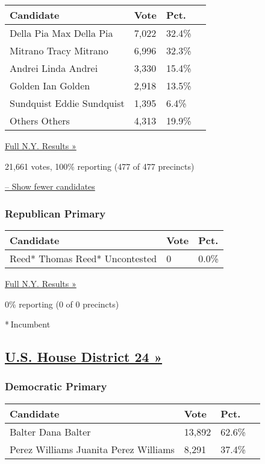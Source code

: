 \begin{longtable}[]{@{}llll@{}}
\toprule
Candidate & Vote & Pct. &\tabularnewline
\midrule
\endhead
 Della Pia Max Della Pia & 7,022 & 32.4\% &\tabularnewline
 Mitrano Tracy Mitrano & 6,996 & 32.3\% &\tabularnewline
 Andrei Linda Andrei & 3,330 & 15.4\% &\tabularnewline
 Golden Ian Golden & 2,918 & 13.5\% &\tabularnewline
 Sundquist Eddie Sundquist & 1,395 & 6.4\% &\tabularnewline
 Others Others & 4,313 & 19.9\% &\tabularnewline
\bottomrule
\end{longtable}

\href{https://www.nytimes3xbfgragh.onion/elections/results/new-york}{Full
N.Y. Results »}

21,661 votes, 100\% reporting (477 of 477 precincts)

\protect\hyperlink{}{-- Show fewer candidates}

\hypertarget{republican-primary-17}{%
\subsubsection{Republican Primary}\label{republican-primary-17}}

\begin{longtable}[]{@{}lll@{}}
\toprule
Candidate & Vote & Pct.\tabularnewline
\midrule
\endhead
 Reed* Thomas Reed* Uncontested & 0 & 0.0\%\tabularnewline
\bottomrule
\end{longtable}

\href{https://www.nytimes3xbfgragh.onion/elections/results/new-york}{Full
N.Y. Results »}

0\% reporting (0 of 0 precincts)

* Incumbent

\hypertarget{us-house-district-24-}{%
\subsection{\texorpdfstring{\href{https://www.nytimes3xbfgragh.onion/elections/results/new-york-house-district-24-primary-election}{U.S.
House District 24
»}}{U.S. House District 24 »}}\label{us-house-district-24-}}

\hypertarget{democratic-primary-24}{%
\subsubsection{Democratic Primary}\label{democratic-primary-24}}

\begin{longtable}[]{@{}llll@{}}
\toprule
Candidate & Vote & Pct. &\tabularnewline
\midrule
\endhead
 Balter Dana Balter & 13,892 & 62.6\% &\tabularnewline
 Perez Williams Juanita Perez Williams & 8,291 & 37.4\% &\tabularnewline
\bottomrule
\end{longtable}

